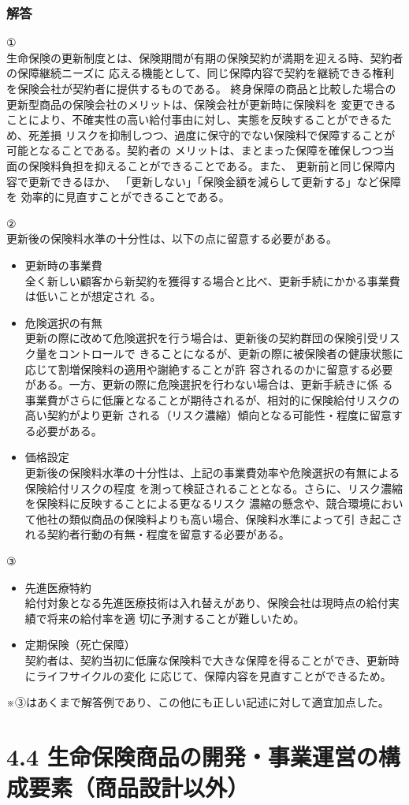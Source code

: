 \documentclass[report,gutter=10mm,fore-edge=10mm,uplatex,dvipdfmx]{jlreq}
\begin{document}
\subsubsection{解答}
①\\
生命保険の更新制度とは、保険期間が有期の保険契約が満期を迎える時、契約者の保障継続ニーズに
応える機能として、同じ保障内容で契約を継続できる権利を保険会社が契約者に提供するものである。
終身保障の商品と比較した場合の更新型商品の保険会社のメリットは、保険会社が更新時に保険料を
変更できることにより、不確実性の高い給付事由に対し、実態を反映することができるため、死差損
リスクを抑制しつつ、過度に保守的でない保険料で保障することが可能となることである。契約者の
メリットは、まとまった保障を確保しつつ当面の保険料負担を抑えることができることである。また、
更新前と同じ保障内容で更新できるほか、
「更新しない」「保険金額を減らして更新する」など保障を
効率的に見直すことができることである。

②\\
更新後の保険料水準の十分性は、以下の点に留意する必要がある。
\begin{itemize}
 \item 更新時の事業費\\
 全く新しい顧客から新契約を獲得する場合と比べ、更新手続にかかる事業費は低いことが想定され
 る。
 \item 危険選択の有無\\
 更新の際に改めて危険選択を行う場合は、更新後の契約群団の保険引受リスク量をコントロールで
 きることになるが、更新の際に被保険者の健康状態に応じて割増保険料の適用や謝絶することが許
 容されるのかに留意する必要がある。一方、更新の際に危険選択を行わない場合は、更新手続きに係
 る事業費がさらに低廉となることが期待されるが、相対的に保険給付リスクの高い契約がより更新
 される（リスク濃縮）傾向となる可能性・程度に留意する必要がある。
 \item 価格設定\\
 更新後の保険料水準の十分性は、上記の事業費効率や危険選択の有無による保険給付リスクの程度
 を測って検証されることとなる。さらに、リスク濃縮を保険料に反映することによる更なるリスク
 濃縮の懸念や、競合環境において他社の類似商品の保険料よりも高い場合、保険料水準によって引
 き起こされる契約者行動の有無・程度を留意する必要がある。
\end{itemize}
③
\begin{itemize}
 \item 先進医療特約\\
 給付対象となる先進医療技術は入れ替えがあり、保険会社は現時点の給付実績で将来の給付率を適
 切に予測することが難しいため。
 \item 定期保険（死亡保障）\\
 契約者は、契約当初に低廉な保険料で大きな保障を得ることができ、更新時にライフサイクルの変化
 に応じて、保障内容を見直すことができるため。
\end{itemize}
※③はあくまで解答例であり、この他にも正しい記述に対して適宜加点した。

\section{4.4 生命保険商品の開発・事業運営の構成要素（商品設計以外）}
\end{document}

